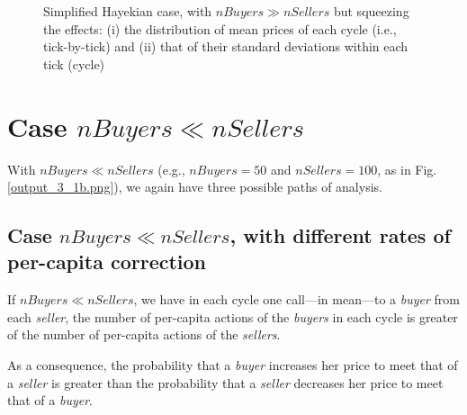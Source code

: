 \documentclass[10pt]{report}
\begin{document}
\begin{appendices}
\begin{figure}[H]
\begin{center}
\caption{Simplified Hayekian case, with $nBuyers \gg nSellers$ but squeezing the effects: (i) the distribution of mean prices of each cycle (i.e., tick-by-tick) and (ii) that of their standard deviations within each tick (cycle)}
\label{output_3_3aaa.png}
\end{center}
\end{figure}


\section{Case $nBuyers \ll nSellers$}
With $nBuyers \ll nSellers$ (e.g., $nBuyers=50$ and $nSellers=100$, as in Fig. \ref{output_3_1b.png}), we again have three possible paths of analysis. 

\subsection{Case $nBuyers \ll nSellers$, with different rates of per-capita correction}\label{nBuyers < nSellers with different rates of per-capita correction}

If $nBuyers \ll nSellers$, we have in each cycle one call---in mean---to a  \emph{buyer} from each  \emph{seller}, the number of per-capita actions of the \emph{buyers} in each cycle is greater of the number of per-capita actions of the \emph{sellers}.

As a consequence, the probability that a \emph{buyer} increases her price to meet that of a \emph{seller} is greater than the probability that a \emph{seller} decreases her price to meet that of a \emph{buyer}. 


\end{appendices}
\end{document}
